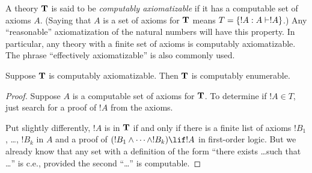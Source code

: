 \documentclass[../../include/open-logic-section]{subfiles}
\begin{document}


A theory $\mathbf{T}$ is said to be {\em computably axiomatizable} if it has a
computable set of axioms $A$. (Saying that $A$ is a set of axioms for
$\mathbf{T}$ means $T = \Setabs{!A}{A \Proves !A}$.) Any ``reasonable''
axiomatization of the natural numbers will have this property. In
particular, any theory with a finite set of axioms is computably
axiomatizable. The phrase ``effectively axiomatizable'' is also
commonly used.

\begin{lem}
Suppose $\mathbf{T}$ is computably axiomatizable. Then $\mathbf{T}$ is computably
enumerable.
\end{lem}

\begin{proof}
Suppose $A$ is a computable set of axioms for $\mathbf{T}$. To determine
if $!A \in T$, just search for a proof of $!A$ from the axioms.

Put slightly differently, $!A$ is in $\mathbf{T}$ if and only if there is
a finite list of axioms $!B_1$, \dots, $!B_k$ in $A$ and a proof of
$(!B_1 \land \dots \land !B_k) \lif !A$ in first-order logic.  But
we already know that any set with a definition of the form ``there
exists \dots such that \dots'' is c.e., provided the second ``\dots''
is computable.
\end{proof}
\end{document}
